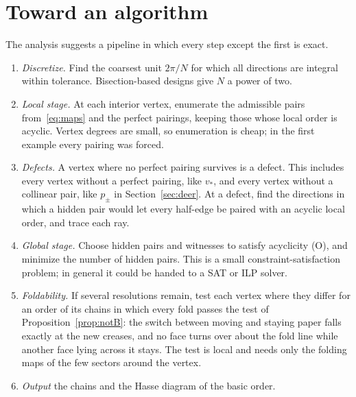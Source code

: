 \documentclass[11pt]{article}
\theoremstyle{definition}
\theoremstyle{remark}
\newcommand{\vstar}{v_\ast}
\begin{document}
\section{Toward an algorithm}\label{sec:algo}

The analysis suggests a pipeline in which every step except the first is exact.
\begin{enumerate}
\item \emph{Discretize.} Find the coarsest unit $2\pi/N$ for which all directions are integral within tolerance. Bisection-based designs give $N$ a power of two.
\item \emph{Local stage.} At each interior vertex, enumerate the admissible pairs from~\eqref{eq:maps} and the perfect pairings, keeping those whose local order is acyclic. Vertex degrees are small, so enumeration is cheap; in the first example every pairing was forced.
\item \emph{Defects.} A vertex where no perfect pairing survives is a defect. This includes every vertex without a perfect pairing, like $\vstar$, and every vertex without a collinear pair, like $p_\pm$ in Section~\ref{sec:deer}. At a defect, find the directions in which a hidden pair would let every half-edge be paired with an acyclic local order, and trace each ray.
\item \emph{Global stage.} Choose hidden pairs and witnesses to satisfy acyclicity (O), and minimize the number of hidden pairs. This is a small constraint-satisfaction problem; in general it could be handed to a SAT or ILP solver.
\item \emph{Foldability.} If several resolutions remain, test each vertex where they differ for an order of its chains in which every fold passes the test of Proposition~\ref{prop:notB}: the switch between moving and staying paper falls exactly at the new creases, and no face turns over about the fold line while another face lying across it stays. The test is local and needs only the folding maps of the few sectors around the vertex.
\item \emph{Output} the chains and the Hasse diagram of the basic order.
\end{enumerate}
\end{document}
